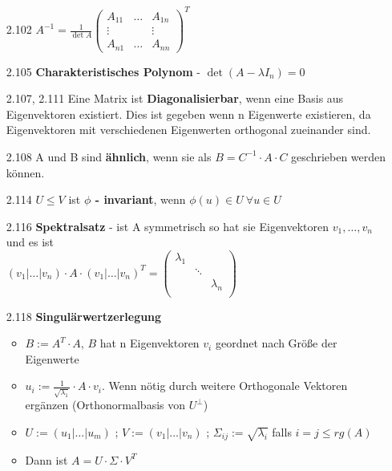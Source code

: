 \documentclass{scrartcl}
\begin{document}
\begin{itemize}
    \item [2.102] $A^{-1} = \frac{1}{\det A}
    \begin{pmatrix}
    A_{11} & \hdots & A_{1n} \\
    \vdots & & \vdots\\
    A_{n1} & \hdots & A_{nn}
    \end{pmatrix}^T$

    \item [2.105] \textbf{Charakteristisches Polynom} - $\det(A - \lambda I_n) = 0$

    \item [2.107, 2.111] Eine Matrix ist \textbf{Diagonalisierbar}, wenn eine Basis aus Eigenvektoren existiert. Dies ist gegeben wenn n Eigenwerte existieren, da Eigenvektoren mit verschiedenen Eigenwerten orthogonal zueinander sind.

    \item [2.108] A und B sind \textbf{ähnlich}, wenn sie als $B = C^{-1} \cdot A \cdot C$ geschrieben werden können.

    \item [2.114] $U \leq V$ ist \textbf{$\phi$ - invariant}, wenn $\phi(u) \in U\ \forall u \in U$

    \item [2.116] \textbf{Spektralsatz} - ist A symmetrisch so hat sie Eigenvektoren $v_1, \hdots, v_n$ und es ist\\ $(v_1|\hdots|v_n) \cdot A \cdot (v_1|\hdots|v_n)^T = \begin{pmatrix}
    \lambda_1 && \\
    &\ddots&\\
    &&\lambda_n\\
    \end{pmatrix}$

    \item [2.118] \textbf{Singulärwertzerlegung}
    \begin{itemize}
        \item $B := A^T \cdot A$, $B$ hat n Eigenvektoren $v_i$ geordnet nach Größe der Eigenwerte
        \item $u_i := \frac{1}{\sqrt{\lambda_1}} \cdot A \cdot v_i$. Wenn nötig durch weitere Orthogonale Vektoren ergänzen (Orthonormalbasis von $U^{\perp}$)
        \item $U := (u_1 | \hdots | u_m)$ ; $V := (v_1 | \hdots | v_n)$ ; $\Sigma_{ij} := \sqrt{\lambda_i}$ falls $i = j \leq rg(A)$
        \item Dann ist $A = U \cdot \Sigma \cdot V^T$
    \end{itemize}


\end{itemize}
\end{document}
